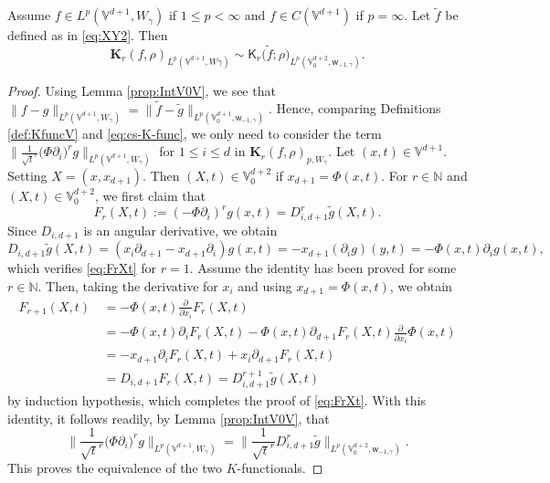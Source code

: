 \documentclass[10pt,a4paper]{amsart}
\def\Kb{{\mathbf K}}
\def\NN{{\mathbb N}}
\def\VV{{\mathbb V}}
\def\g{{\gamma}}
\def\sK{{\mathsf K}}
\def\sw{{\mathsf w}}
\newcommand{\wt}{\widetilde}
\begin{document}
\begin{prop}\label{prop:K-equ}
Assume $f \in L^p(\VV^{d+1}, W_\g)$ if $1\le p < \infty$ and $f \in C(\VV^{d+1})$ if $p = \infty$. Let $\wt f$ be defined
as in \eqref{eq:XY2}. Then 
$$
 \Kb_r(f, \rho)_{L^p(\VV^{d+1}, W\g)} \sim  \sK_r \big(\wt f; \rho\big)_{L^p(\VV_0^{d+2}, \sw_{-1,\g})}.
$$
\end{prop}

\begin{proof}
Using Lemma \ref{prop:IntV0V}, we see that $\|f-g\|_{L^p(\VV^{d+1},W_\g)} = \|\wt f - \wt g\|_{L^p(\VV_0^{d+1}, \sw_{-1,\g})}$.  
Hence, comparing Definitions \ref{def:KfuncV} and \ref{eq:cs-K-func}, we only need to consider the term 
$\Big \|\frac 1{\sqrt{t}^r} \big ( \Phi \partial_i \big)^r g \Big \|_{L^p(\VV^{d+1},W_\g)}$ for $1 \le i \le d$ 
in $\Kb_r(f,\rho)_{p,W_{\g}}$. Let $(x,t) \in \VV^{d+1}$. Setting $X=(x,x_{d+1})$. Then $(X,t) \in \VV_0^{d+2}$ 
if $x_{d+1} = \Phi(x,t)$. For $r \in \NN$ and $(X,t) \in \VV_0^{d+2}$, we first claim that 
\begin{equation} \label{eq:FrXt}
F_r(X,t):=  (- \Phi \partial_i)^r g (x, t) = D_{i, d+1}^r \wt g(X ,t). 
\end{equation}
Since $D_{i,d+1}$ is an angular derivative, we obtain 
$$
   D_{i, d+1} \wt g(X,t) = (x_i \partial_{d+1} - x_{d+1} \partial_i) g(x,t) =   - x_{d+1} (\partial_i g)(y,t) = - \Phi(x,t) \partial_i g(x,t),
$$
which verifies \eqref{eq:FrXt} for $r =1$. Assume the identity has been proved for some $r\in \NN$. Then, taking the
derivative for $x_i$ and using $x_{d+1} = \Phi(x,t)$, we obtain 
\begin{align*}
 F_{r+1}(X,t)\,& =  - \Phi(x,t) \frac{\partial}{\partial x_i} F_r(X,t) \\
      & = - \Phi(x,t) \partial_i F_r(X,t) - \Phi(x,t) \partial_{d+1} F_r(X,t) \frac{\partial}{\partial x_i} \Phi(x,t) \\
      & = - x_{d+1} \partial_i F_r(X,t) + x_i \partial_{d+1} F_r(X,t) \\
      &  = D_{i, d+1} F_r(X,t) = D_{i, d+1}^{r+1} \wt g(X,t)
\end{align*}
by induction hypothesis, which completes the proof of \eqref{eq:FrXt}. With this identity, it follows readily, by 
Lemma \ref{prop:IntV0V}, that 
$$
  \Big \|\frac 1{\sqrt{t}^r} \big ( \Phi \partial_i \big)^r g \Big \|_{L^p(\VV^{d+1},W_\g)}
        =  \Big \|\frac 1{\sqrt{t}^r} D_{i,d+1}^r \tilde{g}\Big \|_{L^p(\VV_0^{d+2},\sw_{-1,\g})}.
$$
This proves the equivalence of the two $K$-functionals. 
\end{proof}
\end{document}
